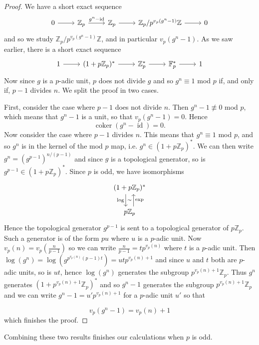 \documentclass[a4paper]{article} %
\theoremstyle{definition}
\newcommand{\Z}{\mathbb{Z}}
\newcommand{\F}{\mathbb{F}}
\DeclareMathOperator{\id}{id}           %
\DeclareMathOperator{\coker}{coker}     %
\begin{document}
\begin{proof}
We have a short exact sequence
\[
\begin{tikzcd}
0 \rar & \Z_p \rar{g^n - \operatorname{id}} & \Z_p \rar{} & \Z_p/{p^{v_p(g^n-1)}\Z} \rar & 0
\end{tikzcd}
\]
and so we study $\Z_p/{p^{v_p(g^n-1)}\Z}$, and in particular $v_p(g^n-1)$. As we saw earlier, there is a short exact sequence
\[
\begin{tikzcd}
1 \rar & (1+p\Z_p)^* \rar{} & \Z_p^* \rar{} & \F_p^* \rar & 1
\end{tikzcd}
\]
Now since $g$ is a $p$-adic unit, $p$ does not divide $g$ and so $g^n \equiv 1$ mod $p$ if, and only if, $p-1$ divides $n$. We split the proof in two cases.

First, consider the case where $p-1$ does not divide $n$. Then $g^n -1 \not\equiv 0$ mod $p$, which means that $g^n -1$ is a unit, so that $v_p(g^n - 1) = 0$. Hence
\[
\coker ( g^n - \id ) = 0.
\]
Now consider the case where $p-1$ divides $n$. This means that $g^n \equiv 1$ mod $p$, and so $g^n$ is in the kernel of the mod $p$ map, i.e. $g^n \in (1 + p\Z_p)^*$. We can then write $g^n = (g^{p-1})^{n/(p-1)}$ and since $g$ is a topological generator, so is $g^{p-1} \in (1 + p\Z_p)^*$. Since $p$ is odd, we have isomorphisms
\[
\begin{tikzcd}
  (1+ p\Z_p)^* \arrow[d, "\log"', "\sim", shift right=1.3ex] \\
  p\Z_p \arrow[u, "\exp"', shift right = 1.3ex]{exp}
\end{tikzcd}
\]
Hence the topological generator $g^{p-1}$ is sent to a topological generator of $p\Z_p$. Such a generator is of the form $pu$ where $u$ is a $p$-adic unit. Now $v_p(n) = v_p(\frac{n}{p-1})$ so we can write $\frac{n}{p-1} = tp^{v_p(n)}$ where $t$ is a $p$-adic unit. Then $\log(g^n) = \log(g^{p^{v_p(n)}(p-1)t}) = utp^{v_p(n)+1}$ and since $u$ and $t$ both are $p$-adic units, so is $ut$, hence $\log(g^n)$ generates the subgroup $p^{v_p(n)+1}\Z_p$.
Thus $g^n$ generates $(1 + p^{v_p(n)+1}\Z_p)^*$ and so $g^{n}-1$ generates the subgroup $p^{v_p(n)+1}\Z_p$ and we can write $g^n-1 =u' p^{v_p(n)+1}$ for a $p$-adic unit $u'$ so that
\iffalse
But if $g^{p-1} \mapsto pu$ then $g^n \mapsto \frac{n}{p-1}pu$ under $\log$, and $$v_p\left(\frac{n}{p-1}pu\right) = v_p(n)+1.$$ We conclude that \fi
\[
v_p(g^n - 1 ) = v_p(n) + 1
\]
which finishes the proof.
\end{proof}
Combining these two results finishes our calculations when $p$ is odd.
\end{document}
